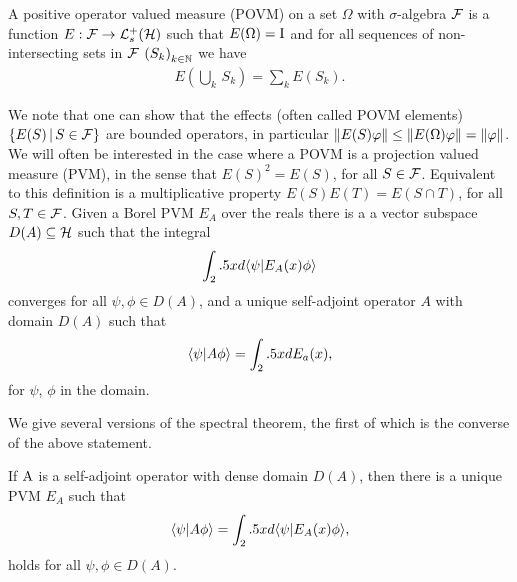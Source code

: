 \begin{defn}\label{defn:povm}
  A positive operator valued measure (POVM) on a set $\Omega$ with $\sigma$-algebra $\mathcal{F}$ is a function $E:\fcal\to\posops[\hcal]$ such that $E(\Omega) = \operatorname{I}$ and for all sequences of non-intersecting sets in $\mathcal{F}$ $\seq{S_k}[k\in\N]$ we have 
  \begin{align}
    E\left(\bigcup_k \,S_k\right) = \sum_k E(S_k).
  \end{align}
\end{defn}
We note that one can show that the effects (often called POVM elements) $\left\{E(S)\,\middle|\,S\in\mathcal{F}\right\}$ are bounded operators, in particular ${\left\lVert{E(S)\varphi}\right\rVert} \leq {\left\lVert{E(\Omega)\varphi}\right\rVert} = {\left\lVert{\varphi}\right\rVert}$. We will often be interested in the case where a POVM is a projection valued measure (PVM), in the sense that $E(S)^2 = E(S)$, for all $S\in\mathcal{F}$. Equivalent to this definition is a multiplicative property $E(S)E(T) = E(S\cap T)$, for all $S,T\in\mathcal{F}$. Given a Borel PVM $E_A$ over the reals there is a a vector subspace $D(A)\subseteq\mathcal{H}$ such that the integral
\begin{align}
  \int_2.5 x d\langle \psi|E_A(x)\phi\rangle 
\end{align}
converges for all $\psi,\phi\in D(A)$, and a unique self-adjoint operator $A$ with domain $D(A)$ such that 
\begin{align}
  \langle \psi|A\phi\rangle = \int_2.5 x dE_a(x),
\end{align}
for $\psi$, $\phi$ in the domain.

We give several versions of the spectral theorem, the first of which is the converse of the above statement.

\begin{thm}
  If $\operatorname{A}$ is a self-adjoint operator with dense domain $D(A)$, then there is a unique PVM $E_A$ such that
  \begin{align}
    \langle \psi|A\phi\rangle = \int_2.5 x d\langle \psi|E_A(x)\phi\rangle,
  \end{align}
  holds for all $\psi,\phi\in D(A)$.
\end{thm}


